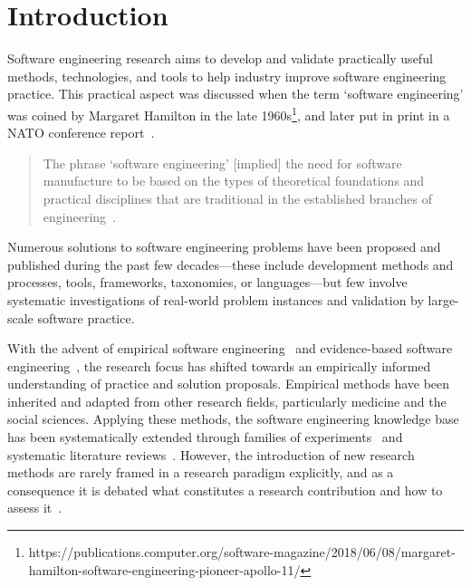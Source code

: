 \documentclass[graybox]{svmult}
\newcommand{\peggy}[1]{\textcolor{blue}{{\it [Peggy says: #1]}}}
\newcommand{\per}[1]{\textcolor{cyan}{{\it [Per says: #1]}}}
\newcommand{\peggy}[1]{}
\newcommand{\per}[1]{}
\begin{document}
\section{Introduction}
\label{sec:intro}

Software engineering research aims to develop and validate practically useful methods, technologies, and tools to help industry improve software engineering practice. This practical aspect was discussed when the term `software engineering' was coined by Margaret Hamilton in the late 1960s\footnote{https://publications.computer.org/software-magazine/2018/06/08/margaret-hamilton-software-engineering-pioneer-apollo-11/}, and later put in print in a NATO conference report~\cite{Nato1968}. 

\begin{quote}
{The phrase `software engineering'  [implied] the need for software manufacture to be based on the types of theoretical foundations and practical disciplines that are traditional in the established branches of engineering}~\cite[p. 13]{Nato1968}. 
\end{quote}

Numerous solutions to software engineering problems have been proposed and published during the past few decades---these include development methods and processes, tools, frameworks, taxonomies, or languages---but few involve systematic investigations of real-world problem instances and validation by large-scale software practice.

With the advent of empirical software engineering~\cite{Basili86} and evidence-based software engineering~\cite{Kitchenham04}, the research focus has shifted towards an empirically informed understanding of practice and solution proposals. Empirical methods have been inherited and adapted from other research fields, particularly medicine and the social sciences. Applying these methods, the software engineering knowledge base has been systematically extended through families of experiments~\cite{Basili99} and systematic literature reviews~\cite{Kitchenham15}. However, the introduction of new research methods are rarely  framed in a research paradigm explicitly, and as a consequence it is debated what constitutes a research contribution and how to assess it~\cite{BriandGeneralization2017}.
\end{document}

